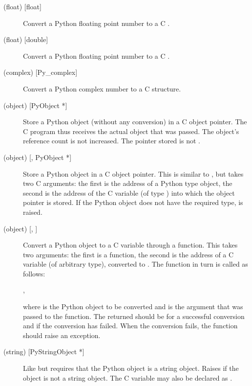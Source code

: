 \begin{description}
  \item[ (float) {[float]}]
  Convert a Python floating point number to a C .

  \item[ (float) {[double]}]
  Convert a Python floating point number to a C .

  \item[ (complex) {[Py_complex]}]
  Convert a Python complex number to a C  structure.

  \item[ (object) {[PyObject *]}]
  Store a Python object (without any conversion) in a C object
  pointer.  The C program thus receives the actual object that was
  passed.  The object's reference count is not increased.  The pointer
  stored is not \NULL.

  \item[ (object) {[, PyObject *]}]
  Store a Python object in a C object pointer.  This is similar to
  , but takes two C arguments: the first is the address of a
  Python type object, the second is the address of the C variable (of
  type ) into which the object pointer is stored.  If
  the Python object does not have the required type,
   is raised.

  \item[ (object) {[, ]}]
  Convert a Python object to a C variable through a 
  function.  This takes two arguments: the first is a function, the
  second is the address of a C variable (of arbitrary type), converted
  to .  The  function in turn is called
  as follows:

  \code{ = }\code{(},
  \code{);}

  where  is the Python object to be converted and
   is the  argument that was passed to the
   function.  The returned 
  should be  for a successful conversion and  if the
  conversion has failed.  When the conversion fails, the
   function should raise an exception.

  \item[ (string) {[PyStringObject *]}]
  Like  but requires that the Python object is a string
  object.  Raises  if the object is not a string
  object.  The C variable may also be declared as .


\end{description}
